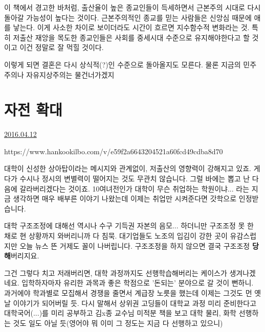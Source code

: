 이 책에서 경고한 바처럼, 출산율이 높은 종교인들이 득세하면서 근본주의 시대로 다시 돌아갈 가능성이 높다는 것이다.
근본주의적인 종교를 믿는 사람들은 신앙심 때문에 애를 낳는다. 이게 사소한 차이로 보이더라도 시간이 흐르면 지수함수적 변화라는 것.
특히 저출산 재앙을 목도한 종교인들은 사회를 중세시대 수준으로 유지해야한다고 할 것이고 이건 정말로 잘 먹힐 것이다.
\vspace{5mm}

이렇게 되면 결혼은 다시 상식적(?)인 수준으로 돌아올지도 모른다. 물론 지금의 민주주의나 자유지상주의는 물건너가겠지
\vspace{5mm}




\section{자전 확대}
\href{https://www.kockoc.com/Apoc/724850}{2016.04.12}

\vspace{5mm}

https://www.hankookilbo.com/v/e59f2a6643204521a60fcd49cdba8d70
\vspace{5mm}

대학이 신성한 상아탑이라는 메시지와 관계없이, 저출산의 영향력이 강해지고 있죠.
게다가 수시나 정시의 변별력이 떨어지는 것도 무관치 않습니다.
그럴 바에는 뽑고 난 다음에 갈라버리겠다는 것이죠.
10여녀전인가 대학이 무슨 취업하는 학원이냐... 라는 지금 생각하면 매우 배부른 이야기 나왔는데
이제는 취업만 시켜준다면 갓학으로 인정받습니다.
\vspace{5mm}

대학 구조조정에 대해선 역시나 수구 기득권 자본의 음모... 하더니만
구조조정 못 한 채로 현 상황까지 와버리니까 다 침묵.
대기업들도 노조의 입김이 강한 곳이 유감스럽지만 오늘 뉴스 뜬 거제도 꼴이 나버립니다.
구조조정을 하지 않으면 결국 구조조정 \textbf{당해}버리지요.
\vspace{5mm}

그건 그렇다 치고 저래버리면, 대학 과정까지도 선행학습해버리는 케이스가 생겨나겠네요.
입학하자마자 유리한 과목과 좋은 학점으로 '돈되는' 분야으로 갈 것이 뻔하니.
과거에야 학과별로 모집해서 경쟁을 줄면서 계급장 노릇을 했는데 이제는 그것도 먼 옛날 이야기가 되어버릴 듯.
다시 말해서 상위권 고딩들이 대학교 과정 미리 준비한다고 대학국어(...)를 미리 공부하고
김x종 교수님 미적분 책을 보고 대학 물리, 화학 선행하는 것도 일도 아닐 듯(영어야 뭐 이미 그 정도는 지금 다 선행하고 있으니)
\vspace{5mm}






